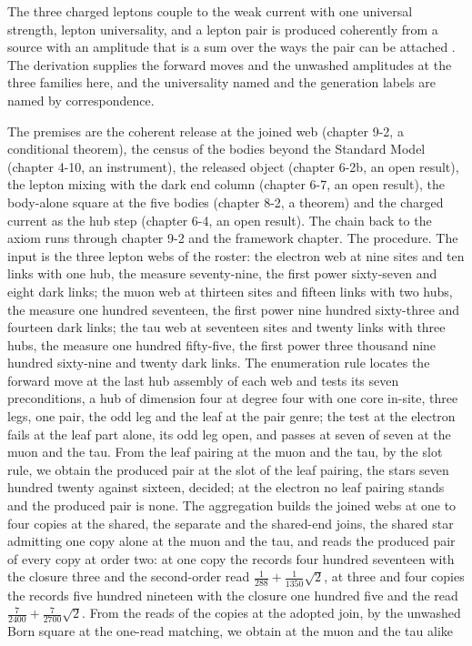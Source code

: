 \begin{chbridge}
The three charged leptons couple to the weak current with one universal strength, lepton universality, and a lepton pair is produced coherently from a source with an amplitude that is a sum over the ways the pair can be attached \cite{FeynmanGellMann1958,Perl1975}. The derivation supplies the forward moves and the unwashed amplitudes at the three families here, and the universality named and the generation labels are named by correspondence.
\end{chbridge}
\begin{chproof}
The premises are the coherent release at the joined web (chapter 9-2, a conditional theorem), the census of the bodies beyond the Standard Model (chapter 4-10, an instrument), the released object (chapter 6-2b, an open result), the lepton mixing with the dark end column (chapter 6-7, an open result), the body-alone square at the five bodies (chapter 8-2, a theorem) and the charged current as the hub step (chapter 6-4, an open result). The chain back to the axiom runs through chapter 9-2 and the framework chapter. The procedure. The input is the three lepton webs of the roster: the electron web at nine sites and ten links with one hub, the measure seventy-nine, the first power sixty-seven and eight dark links; the muon web at thirteen sites and fifteen links with two hubs, the measure one hundred seventeen, the first power nine hundred sixty-three and fourteen dark links; the tau web at seventeen sites and twenty links with three hubs, the measure one hundred fifty-five, the first power three thousand nine hundred sixty-nine and twenty dark links. The enumeration rule locates the forward move at the last hub assembly of each web and tests its seven preconditions, a hub of dimension four at degree four with one core in-site, three legs, one pair, the odd leg and the leaf at the pair genre; the test at the electron fails at the leaf part alone, its odd leg open, and passes at seven of seven at the muon and the tau. From the leaf pairing at the muon and the tau, by the slot rule, we obtain the produced pair at the slot of the leaf pairing, the stars seven hundred twenty against sixteen, decided; at the electron no leaf pairing stands and the produced pair is none. The aggregation builds the joined webs at one to four copies at the shared, the separate and the shared-end joins, the shared star admitting one copy alone at the muon and the tau, and reads the produced pair of every copy at order two: at one copy the records four hundred seventeen with the closure three and the second-order read $\tfrac{1}{288} + \tfrac{1}{1350}\sqrt{2}$, at three and four copies the records five hundred nineteen with the closure one hundred five and the read $\tfrac{7}{2400} + \tfrac{7}{2700}\sqrt{2}$. From the reads of the copies at the adopted join, by the unwashed Born square at the one-read matching, we obtain at the muon and the tau alike

\end{chproof}
